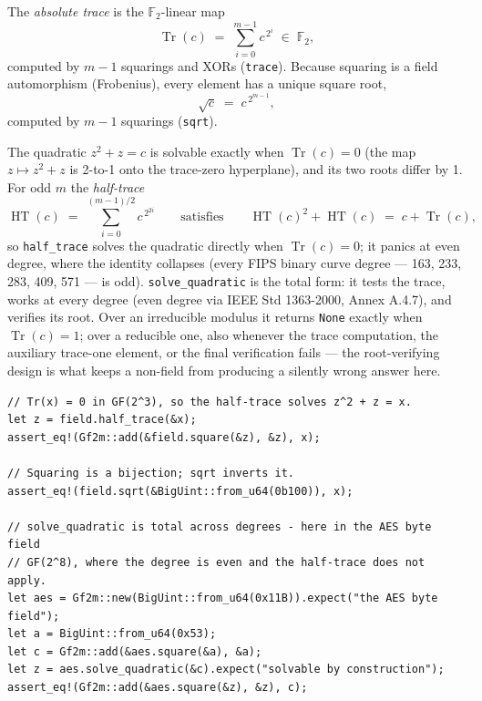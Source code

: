 \documentclass[11pt]{article}
\newcommand{\code}[1]{\texttt{#1}}
\newcommand{\F}{\mathbb{F}}
\newcommand{\Tr}{\operatorname{Tr}}
\newcommand{\HT}{\operatorname{HT}}
\begin{document}
The \emph{absolute trace} is the $\F_2$-linear map
\begin{equation}
\Tr(c) \;=\; \sum_{i=0}^{m-1} c^{\,2^i} \;\in\; \F_2 ,
\end{equation}
computed by $m - 1$ squarings and XORs (\code{trace}). Because squaring is
a field automorphism (Frobenius), every element has a unique square root,
\begin{equation}
\sqrt{c} \;=\; c^{\,2^{m-1}},
\end{equation}
computed by $m - 1$ squarings (\code{sqrt}).

The quadratic $z^2 + z = c$ is solvable exactly when $\Tr(c) = 0$ (the map
$z \mapsto z^2 + z$ is 2-to-1 onto the trace-zero hyperplane), and its two
roots differ by 1. For odd $m$ the \emph{half-trace}
\begin{equation}
\HT(c) \;=\; \sum_{i=0}^{(m-1)/2} c^{\,2^{2i}}
\qquad\text{satisfies}\qquad
\HT(c)^2 + \HT(c) \;=\; c + \Tr(c),
\end{equation}
so \code{half\_trace} solves the quadratic directly when $\Tr(c) = 0$; it
panics at even degree, where the identity collapses (every FIPS binary
curve degree --- 163, 233, 283, 409, 571 --- is odd).
\code{solve\_quadratic} is the total form: it tests the trace, works at
every degree (even degree via IEEE Std 1363-2000, Annex A.4.7), and
verifies its root. Over an irreducible modulus it returns \code{None}
exactly when $\Tr(c) = 1$; over a reducible one, also whenever the trace
computation, the auxiliary trace-one element, or the final verification
fails --- the root-verifying design is what keeps a non-field from
producing a silently wrong answer here.

\begin{lstlisting}
// Tr(x) = 0 in GF(2^3), so the half-trace solves z^2 + z = x.
let z = field.half_trace(&x);
assert_eq!(Gf2m::add(&field.square(&z), &z), x);

// Squaring is a bijection; sqrt inverts it.
assert_eq!(field.sqrt(&BigUint::from_u64(0b100)), x);

// solve_quadratic is total across degrees - here in the AES byte field
// GF(2^8), where the degree is even and the half-trace does not apply.
let aes = Gf2m::new(BigUint::from_u64(0x11B)).expect("the AES byte field");
let a = BigUint::from_u64(0x53);
let c = Gf2m::add(&aes.square(&a), &a);
let z = aes.solve_quadratic(&c).expect("solvable by construction");
assert_eq!(Gf2m::add(&aes.square(&z), &z), c);
\end{lstlisting}
\end{document}
